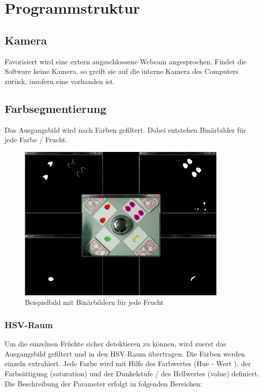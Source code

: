 
\section{Programmstruktur}
\label{sec:Programmstruktur}

\subsection{Kamera}
Favorisiert wird eine extern angeschlossene Webcam angesprochen. Findet die Software keine Kamera, so greift sie auf die interne Kamera des Computers zurück, insofern eine vorhanden ist.

\subsection{Farbsegmentierung}

Das Ausgangsbild wird nach Farben gefiltert. Dabei entstehen Binärbilder für jede Farbe / Frucht. 

\begin{figure}[h]
    \centering
    \includegraphics[width=10cm]{Abbildungen/Binaerbild01}
    \caption[Binär01]{Beispielbild mit Binärbildern für jede Frucht}
    \label{fig:Binär01}
\end{figure}

\subsubsection{HSV-Raum}

Um die einzelnen Früchte sicher detektieren zu können, wird zuerst das Ausgangsbild gefiltert und in den HSV-Raum übertragen. Die Farben werden einzeln extrahiert. Jede Farbe wird mit Hilfe des Farbwertes (Hue - Wert ), der Farbsättigung (saturation) und der Dunkelstufe / des Hellwertes (value) definiert. Die Beschreibung der Parameter erfolgt in folgenden Bereichen:

